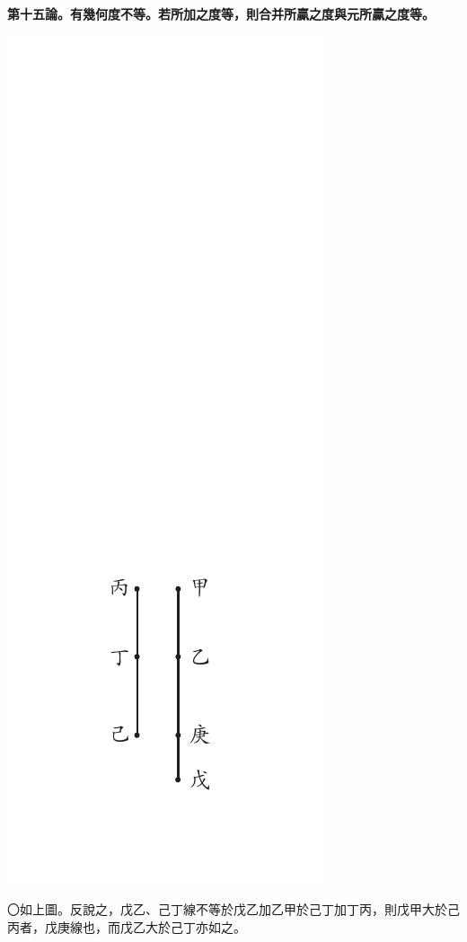 \documentclass[12pt,b5paper,landscape]{article}
\newcommand{\bcom}[1]{〇#1}
\newcommand{\cthm}[1]{{
\vspace{8pt}

\bfseries #1}}
\begin{document}
\begin{multicols}{2}
\cthm{第十五論。有幾何度不等。若所加之度等，則合并所贏之度與元所贏之度等。}
\begin{center}
\includegraphics[angle=90]{eu32}
\end{center}
\bcom{如上圖。反說之，戊乙、己丁線不等於戊乙加乙甲於己丁加丁丙，則戊甲大於己丙者，戊庚線也，而戊乙大於己丁亦如之。}


\end{multicols}
\end{document}
